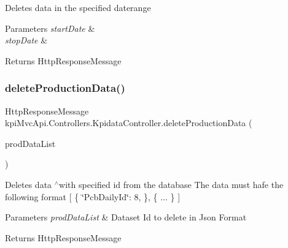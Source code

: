 Deletes data in the specified daterange 


\begin{DoxyParams}{Parameters}
{\em start\+Date} & \\
\hline
{\em stop\+Date} & \\
\hline
\end{DoxyParams}
\begin{DoxyReturn}{Returns}
{\ttfamily Http\+Response\+Message} 
\end{DoxyReturn}
\mbox{\label{classkpi_mvc_api_1_1_controllers_1_1_kpidata_controller_af1c1e99336a8408bbe4b637cfaaddc4b}} 
\subsubsection{\texorpdfstring{delete\+Production\+Data()}{deleteProductionData()}\hspace{0.1cm}{\footnotesize\ttfamily [1/4]}}
{\footnotesize\ttfamily Http\+Response\+Message kpi\+Mvc\+Api.\+Controllers.\+Kpidata\+Controller.\+delete\+Production\+Data (\begin{DoxyParamCaption}\item[{List$<$ \hyperlink{classkpi_mvc_api_1_1_data_transfer_objects_1_1_production_data_dto}{Production\+Data\+Dto} $>$}]{prod\+Data\+List }\end{DoxyParamCaption})\hspace{0.3cm}{\ttfamily [inline]}}



Deletes data $^\wedge$with specified id from the database The data must hafe the following format \mbox{[} \{ \char`\"{}\+Pcb\+Daily\+Id\char`\"{}\+: 8, \}, \{ ... \} \mbox{]} 


\begin{DoxyParams}{Parameters}
{\em prod\+Data\+List} & Dataset Id to delete in Json Format \\
\hline
\end{DoxyParams}
\begin{DoxyReturn}{Returns}
{\ttfamily Http\+Response\+Message} 
\end{DoxyReturn}
\mbox{\label{classkpi_mvc_api_1_1_controllers_1_1_kpidata_controller_af1c1e99336a8408bbe4b637cfaaddc4b}} 
